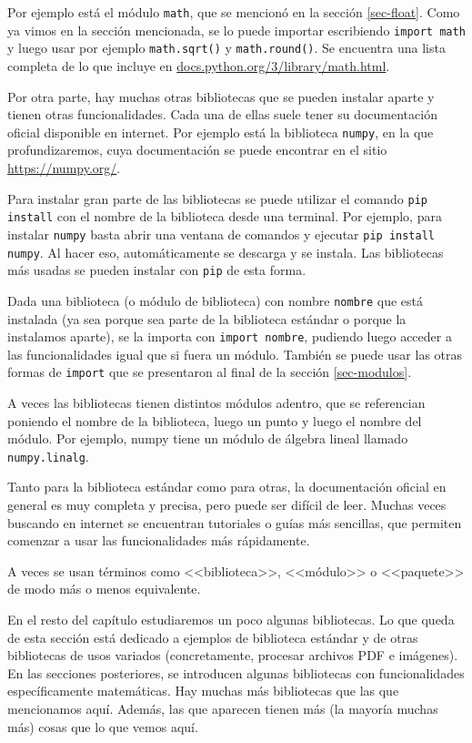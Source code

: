 \documentclass[a4paper, 12pt]{report}
\theoremstyle{definition}
\begin{document}
Por ejemplo está el módulo {\tt math}, que se mencionó en la sección \ref{sec-float}. Como ya vimos en la sección mencionada, se lo puede importar escribiendo {\tt import math} y luego usar por ejemplo {\tt math.sqrt()} y {\tt math.round()}. Se encuentra una lista completa de lo que incluye en \href{https://docs.python.org/3/library/math.html}{docs.python.org/3/library/math.html}.

Por otra parte, hay muchas otras bibliotecas que se pueden instalar aparte y tienen otras funcionalidades. Cada una de ellas suele tener su documentación oficial disponible en internet. Por ejemplo está la biblioteca {\tt numpy}, en la que profundizaremos, cuya documentación se puede encontrar en el sitio \href{https://numpy.org/}{https://numpy.org/}.

Para instalar gran parte de las bibliotecas se puede utilizar el comando {\tt pip install} con el nombre de la biblioteca desde una terminal. Por ejemplo, para instalar {\tt numpy} basta abrir una ventana de comandos y ejecutar {\tt pip install numpy}. Al hacer eso, automáticamente se descarga y se instala. Las bibliotecas más usadas se pueden instalar con {\tt pip} de esta forma.

Dada una biblioteca (o módulo de biblioteca) con nombre {\tt nombre} que está instalada (ya sea porque sea parte de la biblioteca estándar o porque la instalamos aparte), se la importa con {\tt import nombre}, pudiendo luego acceder a las funcionalidades igual que si fuera un módulo. También se puede usar las otras formas de {\tt import} que se presentaron al final de la sección \ref{sec-modulos}.

A veces las bibliotecas tienen distintos módulos adentro, que se referencian poniendo el nombre de la biblioteca, luego un punto y luego el nombre del módulo. Por ejemplo, numpy tiene un módulo de álgebra lineal  llamado {\tt numpy.linalg}.

Tanto para la biblioteca estándar como para otras, la documentación oficial en general es muy completa y precisa, pero puede ser difícil de leer. Muchas veces buscando en internet se encuentran tutoriales o guías más sencillas, que permiten comenzar a usar las funcionalidades más rápidamente.

A veces se usan términos como <<biblioteca>>, <<módulo>> o <<paquete>> de modo más o menos equivalente.

En el resto del capítulo estudiaremos un poco algunas bibliotecas. Lo que queda de esta sección está dedicado a ejemplos de biblioteca estándar y de otras bibliotecas de usos variados (concretamente, procesar archivos PDF e imágenes). En las secciones posteriores, se introducen algunas bibliotecas con funcionalidades específicamente matemáticas. Hay muchas más bibliotecas que las que mencionamos aquí. Además, las que aparecen tienen más (la mayoría muchas más) cosas que lo que vemos aquí.
\end{document}
